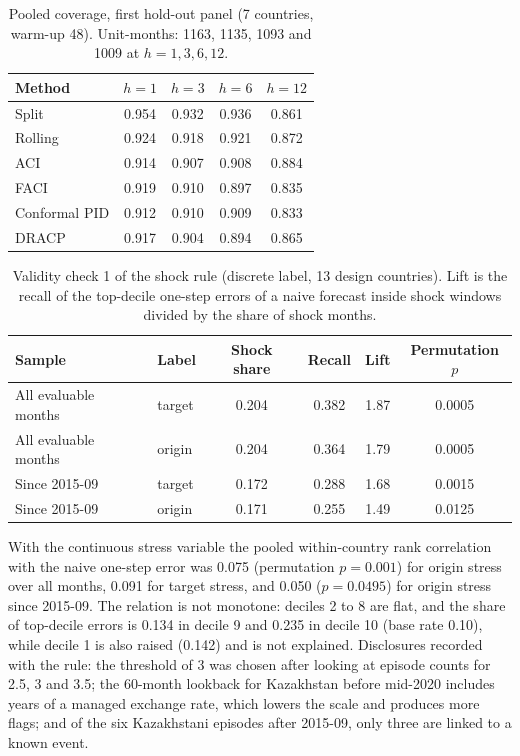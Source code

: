 \begin{table}[H]
\centering
\caption{Pooled coverage, first hold-out panel (7 countries, warm-up 48). Unit-months: 1163, 1135, 1093 and 1009 at $h=1,3,6,12$.}
\label{tab:pooled_ho}
\small
\begin{tabular}{@{}lcccc@{}}
\toprule
Method & $h=1$ & $h=3$ & $h=6$ & $h=12$ \\
\midrule
Split & 0.954 & 0.932 & 0.936 & 0.861 \\
Rolling & 0.924 & 0.918 & 0.921 & 0.872 \\
ACI & 0.914 & 0.907 & 0.908 & 0.884 \\
FACI & 0.919 & 0.910 & 0.897 & 0.835 \\
Conformal PID & 0.912 & 0.910 & 0.909 & 0.833 \\
DRACP & 0.917 & 0.904 & 0.894 & 0.865 \\
\bottomrule
\end{tabular}
\end{table}

\begin{table}[H]
\centering
\caption{Validity check 1 of the shock rule (discrete label, 13 design countries). Lift is the recall of the top-decile one-step errors of a naive forecast inside shock windows divided by the share of shock months.}
\label{tab:validity}
\small
\begin{tabular}{@{}llcccc@{}}
\toprule
Sample & Label & Shock share & Recall & Lift & Permutation $p$ \\
\midrule
All evaluable months & target & 0.204 & 0.382 & 1.87 & 0.0005 \\
All evaluable months & origin & 0.204 & 0.364 & 1.79 & 0.0005 \\
Since 2015-09 & target & 0.172 & 0.288 & 1.68 & 0.0015 \\
Since 2015-09 & origin & 0.171 & 0.255 & 1.49 & 0.0125 \\
\bottomrule
\end{tabular}
\end{table}

With the continuous stress variable the pooled within-country rank correlation with the naive one-step error was 0.075 (permutation $p=0.001$) for origin stress over all months, 0.091 for target stress, and 0.050 ($p=0.0495$) for origin stress since 2015-09. The relation is not monotone: deciles 2 to 8 are flat, and the share of top-decile errors is 0.134 in decile 9 and 0.235 in decile 10 (base rate 0.10), while decile 1 is also raised (0.142) and is not explained. Disclosures recorded with the rule: the threshold of 3 was chosen after looking at episode counts for 2.5, 3 and 3.5; the 60-month lookback for Kazakhstan before mid-2020 includes years of a managed exchange rate, which lowers the scale and produces more flags; and of the six Kazakhstani episodes after 2015-09, only three are linked to a known event.

